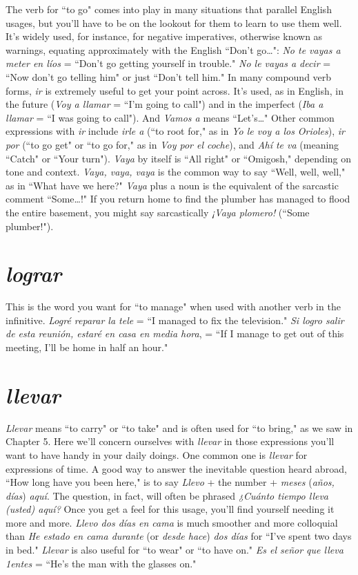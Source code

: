 The verb for ``to go" comes into play in many situations that
parallel English usages, but you'll have to be on the lookout for them
to learn to use them well. It's widely used, for instance, for negative
imperatives, otherwise known as warnings, equating approximately
with the English ``Don't go\ldots{}": \emph{No te vayas a meter en líos} =
``Don't go getting yourself in trouble." \emph{No le vayas a decir} = ``Now
don't go telling him" or just ``Don't tell him." In many compound verb
forms, \emph{ir} is extremely useful to get your point across. It's used, as in
English, in the future (\emph{Voy a llamar} = ``I'm going to call") and in the
imperfect (\emph{Iba a llamar} = ``I was going to call"). \emph{}And \emph{Vamos a} means
``Let's\ldots{}" Other common expressions with \emph{ir} include \emph{irle a} (``to root
for," as in \emph{Yo le voy a los Orioles}), \emph{ir por} (``to go get" or ``to go for," as
in \emph{Voy por el coche}), and \emph{Ahí te va} (meaning ``Catch" or ``Your turn").
\emph{Vaya} by itself is ``All right" or ``Omigosh," depending on tone and context. \emph{Vaya, vaya, vaya} is the common way to say ``Well, well, well," as
in ``What have we here?" \emph{Vaya} plus a noun is the equivalent of the
sarcastic comment ``Some\ldots{}!" If you return home to find the plumber
has managed to flood the entire basement, you might say sarcastically
\emph{¡Vaya plomero!} (``Some plumber!").

\section{\emph{lograr}}

This is the word you want for ``to manage" when used with
another verb in the infinitive. \emph{Logré reparar la tele} = ``I managed to
fix the television." \emph{Si logro salir de esta reunión, estaré en casa en
	media hora}, = ``If I manage to get out of this meeting, I'll be home in
half an hour."

\section{\emph{llevar}}

\emph{Llevar} means ``to carry" or ``to take" and is often used for
``to bring," as we saw in Chapter 5. Here we'll concern ourselves with
\emph{llevar} in those expressions you'll want to have handy in your daily
doings. One common one is \emph{llevar} for expressions of time. A good way
to answer the inevitable question heard abroad, ``How long have you
been here," is to say \emph{Llevo} + the number + \emph{meses} (\emph{años, días}) \emph{aquí}.
The question, in fact, will often be phrased \emph{¿Cuánto tiempo lleva
	(usted) aquí?} Once you get a feel for this usage, you'll find yourself
needing it more and more. \emph{Llevo dos días en cama} is much smoother
and more colloquial than \emph{He estado en cama durante} (or \emph{desde hace})
\emph{dos días} for ``I've spent two days in bed." \emph{Llevar} is also useful for ``to
wear" or ``to have on." \emph{Es el señor que lleva 1entes} = ``He's the man
with the glasses on."


